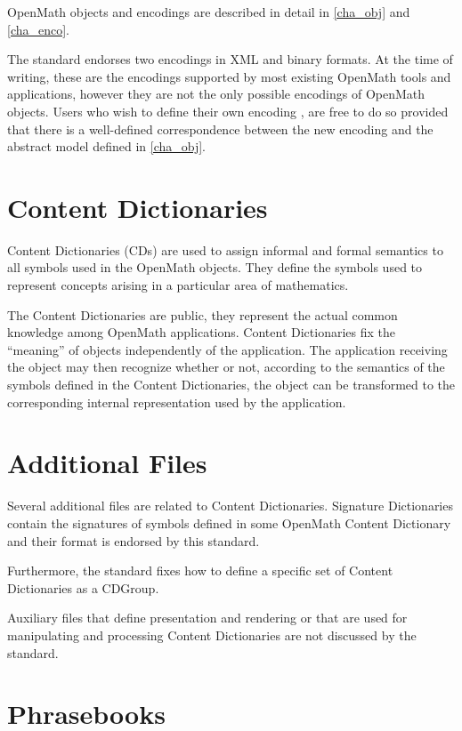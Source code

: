 \documentclass{report}
\def\textquote#1{``#1''}
\def\OM{OpenMath\xspace}
\def\XML{XML\xspace}
\begin{document}
\OM objects and encodings are described in detail in \ref{cha_obj} and \ref{cha_enco}.



The standard endorses two encodings in \XML and binary
formats.
At the time of writing, these are the encodings
supported by most existing \OM tools and applications,
however they are not the only possible encodings of \OM
objects. Users who wish to define their own encoding
, are free to
do so provided that there is
a well-defined correspondence
between the new encoding and the abstract model defined in \ref{cha_obj}. 





\section{Content Dictionaries}\label{sec_intro-cd}


Content Dictionaries (CDs) are used to assign informal and formal
semantics to all symbols used in the \OM objects. They define the
symbols used to represent concepts arising in a particular area of
mathematics.


The Content Dictionaries are public, they represent the actual
common knowledge among \OM applications.  Content Dictionaries fix
the \textquote{meaning} of objects independently of the
application.  The application receiving the object may then recognize
whether or not, according to the semantics of the symbols defined in
the Content Dictionaries, the object can be transformed to the
corresponding internal representation used by the application.

\section{Additional Files}\label{sec_addnfiles} 
Several additional files are related to Content Dictionaries.  Signature Dictionaries
contain the signatures of symbols defined in some \OM Content Dictionary and their format
is endorsed by this standard.

Furthermore, the standard fixes how to define a specific set of Content Dictionaries as a
CDGroup.

Auxiliary files that define presentation and rendering or that are used for manipulating
and processing Content Dictionaries are not discussed by the standard.

\section{Phrasebooks}\label{sec_phrasebooks}
\end{document}
